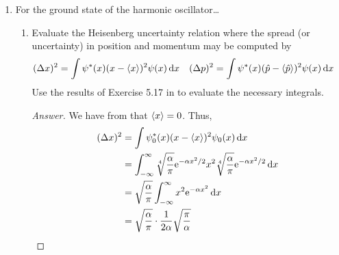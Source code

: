 \documentclass[../psets.tex]{subfiles}
\begin{document}
\begin{enumerate}
\begin{proof}[Answer]
        Since the square of either an odd or an even function is even, $\psi_v^2$ is even for all $v$. Additionally, $x^k$ is odd for all $k$. Thus, $x^k\psi_v^2$ is odd for all $k,v$. But this means that
        \begin{equation*}
            \prb{x^k} = \int_{-\infty}^\infty\psi_v(x)x^k\psi_v(x)\dd{x} = 0
        \end{equation*}
        as desired.\par
        Similarly, since the derivative of an even function is odd and vice versa, we know that all odd-order derivatives of $\psi_v$ have opposite parity to $\psi_v$. But this implies that the product of $\psi_v$ and an odd-order derivative of $\psi_v$ is always odd. It follows that
        \begin{equation*}
            \prb{p^k} = \int_{-\infty}^\infty\psi_v(x)\left( -i\hbar\dv{x} \right)^k\psi_v(x)\dd{x} = 0
        \end{equation*}
        as desired.
    \end{proof}
    \item For the ground state of the harmonic oscillator\dots
    \begin{enumerate}
        \item Evaluate the Heisenberg uncertainty relation where the spread (or uncertainty) in position and momentum may be computed by
        \begin{align*}
            (\Delta x)^2 &= \int\psi^*(x)(x-\langle{x}\rangle)^2\psi(x)\dd{x}&
            (\Delta p)^2 &= \int\psi^*(x)(\hat{p}-\langle{\hat{p}}\rangle)^2\psi(x)\dd{x}
        \end{align*}
        Use the results of Exercise 5.17 in \textcite{bib:McQuarrieSimon} to evaluate the necessary integrals.
        \begin{proof}[Answer]
            We have from \textcite{bib:McQuarrieSimon} that $\langle{x}\rangle=0$. Thus,
            \begingroup
            \allowdisplaybreaks
            \begin{align*}
                (\Delta x)^2 &= \int\psi_0^*(x)(x-\prb{x})^2\psi_0(x)\dd{x}\\
                &= \int_{-\infty}^\infty\sqrt[4]{\frac{\alpha}{\pi}}\e[-\alpha x^2/2]x^2\sqrt[4]{\frac{\alpha}{\pi}}\e[-\alpha x^2/2]\dd{x}\\
                &= \sqrt{\frac{\alpha}{\pi}}\int_{-\infty}^\infty x^2\e[-\alpha x^2]\dd{x}\\
                &= \sqrt{\frac{\alpha}{\pi}}\cdot\frac{1}{2\alpha}\sqrt{\frac{\pi}{\alpha}}\\

\end{align*}
\end{proof}
\end{enumerate}
\end{enumerate}
\end{document}
